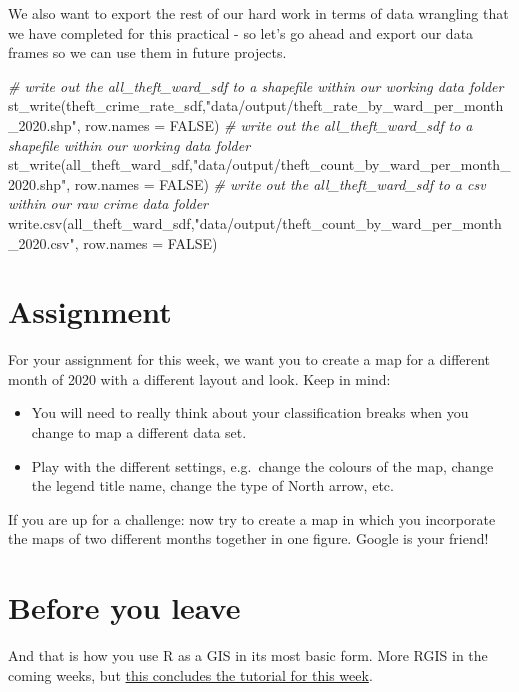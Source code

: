 \documentclass[
]{book}
\newenvironment{Shaded}{\begin{snugshade}}{\end{snugshade}}
\newcommand{\AttributeTok}[1]{\textcolor[rgb]{0.77,0.63,0.00}{#1}}
\newcommand{\CommentTok}[1]{\textcolor[rgb]{0.56,0.35,0.01}{\textit{#1}}}
\newcommand{\ConstantTok}[1]{\textcolor[rgb]{0.00,0.00,0.00}{#1}}
\newcommand{\FunctionTok}[1]{\textcolor[rgb]{0.00,0.00,0.00}{#1}}
\newcommand{\NormalTok}[1]{#1}
\newcommand{\StringTok}[1]{\textcolor[rgb]{0.31,0.60,0.02}{#1}}
\providecommand{\tightlist}{%
  \setlength{\itemsep}{0pt}\setlength{\parskip}{0pt}}
\begin{document}
We also want to export the rest of our hard work in terms of data wrangling that we have completed for this practical - so let's go ahead and export our data frames so we can use them in future projects.

\begin{Shaded}
\begin{Highlighting}[]
\CommentTok{\# write out the all\_theft\_ward\_sdf to a shapefile within our working data folder}
\FunctionTok{st\_write}\NormalTok{(theft\_crime\_rate\_sdf,}\StringTok{"data/output/theft\_rate\_by\_ward\_per\_month\_2020.shp"}\NormalTok{, }\AttributeTok{row.names =} \ConstantTok{FALSE}\NormalTok{)}
\CommentTok{\# write out the all\_theft\_ward\_sdf to a shapefile within our working data folder}
\FunctionTok{st\_write}\NormalTok{(all\_theft\_ward\_sdf,}\StringTok{"data/output/theft\_count\_by\_ward\_per\_month\_2020.shp"}\NormalTok{, }\AttributeTok{row.names =} \ConstantTok{FALSE}\NormalTok{)}
\CommentTok{\# write out the all\_theft\_ward\_sdf to a csv within our raw crime data folder}
\FunctionTok{write.csv}\NormalTok{(all\_theft\_ward\_sdf,}\StringTok{"data/output/theft\_count\_by\_ward\_per\_month\_2020.csv"}\NormalTok{, }\AttributeTok{row.names =} \ConstantTok{FALSE}\NormalTok{)}
\end{Highlighting}
\end{Shaded}

\hypertarget{assignment-w05}{%
\section{Assignment}\label{assignment-w05}}

For your assignment for this week, we want you to create a map for a different month of 2020 with a different layout and look. Keep in mind:

\begin{itemize}
\tightlist
\item
  You will need to really think about your classification breaks when you change to map a different data set.
\item
  Play with the different settings, e.g.~change the colours of the map, change the legend title name, change the type of North arrow, etc.
\end{itemize}

If you are up for a challenge: now try to create a map in which you incorporate the maps of two different months together in one figure. Google is your friend!

\hypertarget{byl-w05}{%
\section{Before you leave}\label{byl-w05}}

And that is how you use R as a GIS in its most basic form. More RGIS in the coming weeks, but \href{https://www.youtube.com/watch?v=Ydg4T2MP7Z8}{this concludes the tutorial for this week}.
\end{document}

